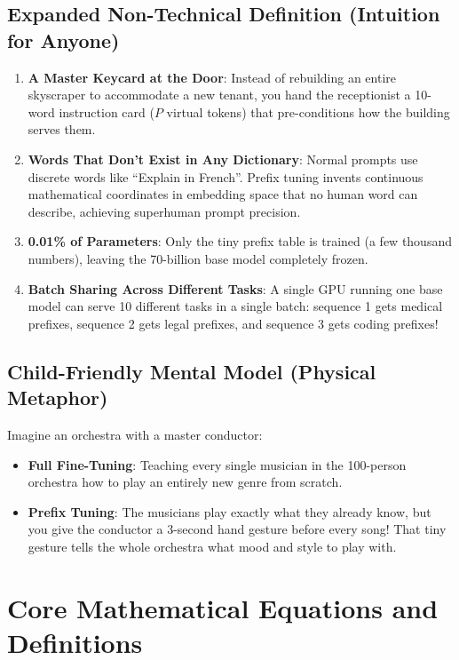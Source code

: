 \documentclass[11pt,a4paper]{article}
\theoremstyle{definition}
\begin{document}
\subsection{Expanded Non-Technical Definition (Intuition for Anyone)}
\begin{enumerate}
    \item \textbf{A Master Keycard at the Door}: Instead of rebuilding an entire skyscraper to accommodate a new tenant, you hand the receptionist a 10-word instruction card ($P$ virtual tokens) that pre-conditions how the building serves them.
    \item \textbf{Words That Don't Exist in Any Dictionary}: Normal prompts use discrete words like ``Explain in French''. Prefix tuning invents continuous mathematical coordinates in embedding space that no human word can describe, achieving superhuman prompt precision.
    \item \textbf{0.01\% of Parameters}: Only the tiny prefix table is trained (a few thousand numbers), leaving the 70-billion base model completely frozen.
    \item \textbf{Batch Sharing Across Different Tasks}: A single GPU running one base model can serve 10 different tasks in a single batch: sequence 1 gets medical prefixes, sequence 2 gets legal prefixes, and sequence 3 gets coding prefixes!
\end{enumerate}

\subsection{Child-Friendly Mental Model (Physical Metaphor)}
Imagine an orchestra with a master conductor:
\begin{itemize}
    \item \textbf{Full Fine-Tuning}: Teaching every single musician in the 100-person orchestra how to play an entirely new genre from scratch.
    \item \textbf{Prefix Tuning}: The musicians play exactly what they already know, but you give the conductor a 3-second hand gesture before every song! That tiny gesture tells the whole orchestra what mood and style to play with.
\end{itemize}

\section{Core Mathematical Equations and Definitions}
\end{document}
